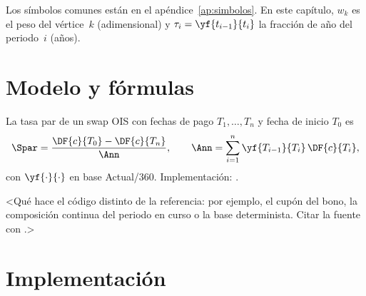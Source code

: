 Los símbolos comunes están en el apéndice~\ref{ap:simbolos}. En este capítulo, $w_k$ es el peso del vértice~$k$
(adimensional) y $\tau_i = \yf{t_{i-1}}{t_i}$ la fracción de año del periodo~$i$ (años).

\section{Modelo y fórmulas}\label{sec:capNN-modelo}

La tasa par de un swap OIS con fechas de pago $T_1,\dots,T_n$ y fecha de inicio $T_0$ es
\begin{equation}\label{eq:capNN-tasa-par}
  \Spar = \frac{\DF{c}{T_0} - \DF{c}{T_n}}{\Ann}, \qquad
  \Ann = \sum_{i=1}^{n} \yf{T_{i-1}}{T_i}\,\DF{c}{T_i},
\end{equation}
con $\yf{\cdot}{\cdot}$ en base Actual/360. Implementación:
.

\begin{diferencia}
  <Qué hace el código distinto de la referencia: por ejemplo, el cupón del bono, la composición continua del
  periodo en curso o la base determinista. Citar la fuente con \citet{clave}.>
\end{diferencia}

\section{Implementación}\label{sec:capNN-implementacion}

